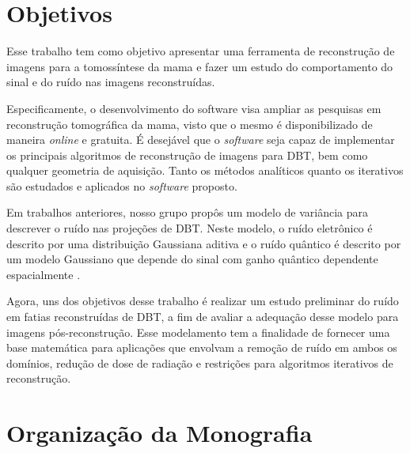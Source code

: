 
\section{Objetivos}

Esse trabalho tem como objetivo apresentar uma ferramenta de reconstrução de imagens para a tomossíntese da mama e fazer um estudo do comportamento do sinal e do ruído nas imagens reconstruídas.

Especificamente, o desenvolvimento do software visa ampliar as pesquisas em reconstrução tomográfica da mama, visto que o mesmo é disponibilizado de maneira \textit{online} e gratuita. É desejável que o \textit{software} seja capaz de implementar os principais algoritmos de reconstrução de imagens para \acs{DBT}, bem como qualquer geometria de aquisição. Tanto os métodos analíticos quanto os iterativos são estudados e aplicados no \textit{software} proposto.

Em trabalhos anteriores, nosso grupo propôs um modelo de variância para descrever o ruído nas projeções de \acs{DBT}. Neste modelo, o ruído eletrônico é descrito por uma distribuição Gaussiana aditiva e o ruído quântico é descrito por um modelo Gaussiano que depende do sinal com ganho quântico dependente espacialmente \cite{borges2017method,borges2018restoration}. 

Agora, uns dos objetivos desse trabalho é realizar um estudo preliminar do ruído em fatias reconstruídas de \acs{DBT}, a fim de avaliar a adequação desse modelo para imagens pós-reconstrução. Esse modelamento tem a finalidade de fornecer uma base matemática para aplicações que envolvam a remoção de ruído em ambos os domínios, redução de dose de radiação e restrições para algoritmos iterativos de reconstrução.


\section{Organização da Monografia}

